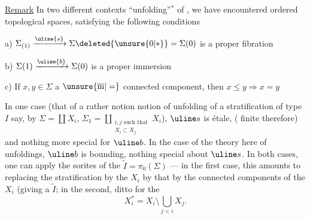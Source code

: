 \uline{Remark} In two different contexts
``unfolding''$^{*}$ of  , we
have encountered ordered topological spaces\inserted{$\Sigma$},
satisfying the following conditions


a) $\Sigma_{(1)}\xrightarrow{\uline{s}}\Sigma\deleted{\unsure{0|*}}=\Sigma(0)$
is a proper fibration

b) $\Sigma(1)\xrightarrow{\uline{b}}\Sigma(0)$ is a proper immersion

c) If $x,y\in\Sigma$   a $\unsure{\overline{\mathrm m}|=}$ connected component,
then $x\leq y\Longrightarrow x=y$


In one case (that of a rather  notion\unsure{)}
 notion of unfolding of a stratification of type $I$ say,
by $\Sigma=\coprod X_i$,
$\Sigma_1=\displaystyle\coprod_{\substack{i,j\text{ such that}\\X_i\subset X_j}}X_i$),
$\uline s$ is étale, ( finite therefore) and nothing more special for $\uline b$.
In the case of the theory 
here of unfoldings,
$\uline b$ is bounding, nothing special about $\uline s$.
In both cases, one can apply the sorites
of the $\widetilde I=\pi_0(\Sigma)$ --- in the first case,
this amounts to replacing the stratification by the $X_i$ by that
by the connected components of the $X_i$ (giving a $\widetilde I$;
in the second,
ditto for the
\[
X_i^{*}=X_i\setminus\bigcup_{j<i}X_j.
\]
